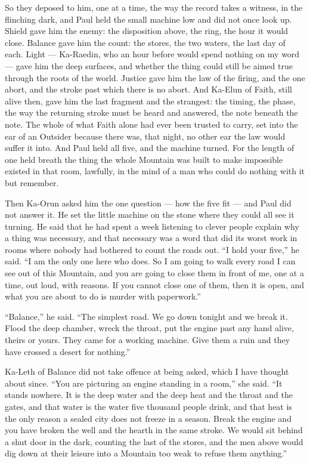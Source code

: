 \ornament

So they deposed to him, one at a time, the way the record takes a witness, in the flinching dark, and Paul held the small machine low and did not once look up. Shield gave him the enemy: the disposition above, the ring, the hour it would close. Balance gave him the count: the stores, the two waters, the last day of each. Light --- Ka-Raedin, who an hour before would spend nothing on my word --- gave him the deep surfaces, and whether the thing could still be aimed true through the roots of the world. Justice gave him the law of the firing, and the one abort, and the stroke past which there is no abort. And Ka-Elun of Faith, still alive then, gave him the last fragment and the strangest: the timing, the phase, the way the returning stroke must be heard and answered, the note beneath the note. The whole of what Faith alone had ever been trusted to carry, set into the ear of an Outsider because there was, that night, no other ear the law would suffer it into. And Paul held all five, and the machine turned. For the length of one held breath the thing the whole Mountain was built to make impossible existed in that room, lawfully, in the mind of a man who could do nothing with it but remember.\par

Then Ka-Orun asked him the one question --- how the five fit --- and Paul did not answer it. He set the little machine on the stone where they could all see it turning. He said that he had spent a week listening to clever people explain why a thing was necessary, and that necessary was a word that did its worst work in rooms where nobody had bothered to count the roads out. ``I hold your five,'' he said. ``I am the only one here who does. So I am going to walk every road I can see out of this Mountain, and you are going to close them in front of me, one at a time, out loud, with reasons. If you cannot close one of them, then it is open, and what you are about to do is murder with paperwork.''\par

``Balance,'' he said. ``The simplest road. We go down tonight and we break it. Flood the deep chamber, wreck the throat, put the engine past any hand alive, theirs or yours. They came for a working machine. Give them a ruin and they have crossed a desert for nothing.''\par

Ka-Leth of Balance did not take offence at being asked, which I have thought about since. ``You are picturing an engine standing in a room,'' she said. ``It stands nowhere. It is the deep water and the deep heat and the throat and the gates, and that water is the water five thousand people drink, and that heat is the only reason a sealed city does not freeze in a season. Break the engine and you have broken the well and the hearth in the same stroke. We would sit behind a shut door in the dark, counting the last of the stores, and the men above would dig down at their leisure into a Mountain too weak to refuse them anything.''\par

